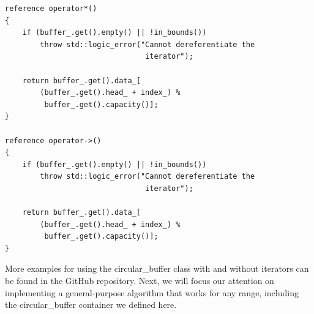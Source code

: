 \begin{lstlisting}[style=styleCXX]
reference operator*()
{
	if (buffer_.get().empty() || !in_bounds())
		throw std::logic_error("Cannot dereferentiate the
								iterator");
	
	return buffer_.get().data_[
		(buffer_.get().head_ + index_) %
		 buffer_.get().capacity()];
}

reference operator->()
{
	if (buffer_.get().empty() || !in_bounds())
		throw std::logic_error("Cannot dereferentiate the
								iterator");
								
	return buffer_.get().data_[
		(buffer_.get().head_ + index_) %
		 buffer_.get().capacity()];
}
\end{lstlisting}

More examples for using the circular\_buffer class with and without iterators can be found in the GitHub repository. Next, we will focus our attention on implementing a general-purpose algorithm that works for any range, including the circular\_buffer container we defined here.






















